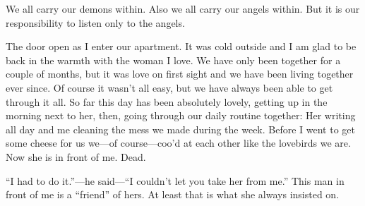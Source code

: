 \documentclass{article}
\title{\vspace{-2cm}\titlevar}
\author{\authorvar}
\date{\datevar}
\begin{document}
	\maketitle
	
	We all carry our demons within. Also we all carry our angels within. But it is our responsibility to listen only to the angels.
	
	\medskip
	
	The door open as I enter our apartment. It was cold outside and I am glad to be back in the warmth with the woman I love. We have only been together for a couple of months, but it was love on first sight and we have been living together ever since. Of course it wasn't all easy, but we have always been able to get through it all. So far this day has been absolutely lovely, getting up in the morning next to her, then, going through our daily routine together: Her writing all day and me cleaning the mess we made during the week. Before I went to get some cheese for us we—of course—coo'd at each other like the lovebirds we are. Now she is in front of me. Dead.
	
	\medskip
	
	\enquote{I had to do it.}—he said—\enquote{I couldn't let you take her from me.} This man in front of me is a \enquote{friend} of hers. At least that is what she always insisted on. 
\end{document}
